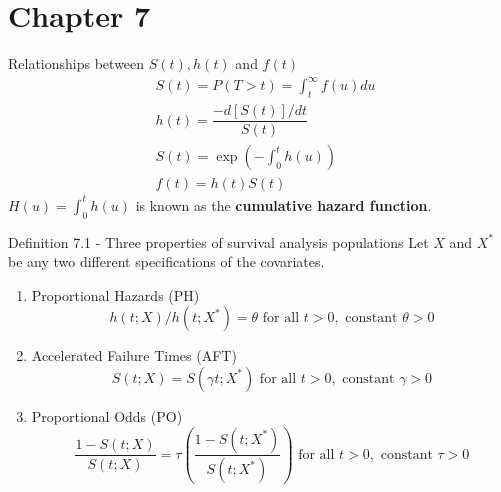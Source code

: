 \documentclass{beamer}
\theoremstyle{definition}
\begin{document}
\section{Chapter 7}
\begin{frame}
\begin{block}{Relationships between $S(t), h(t)$ and $f(t)$}
\begin{align*}
& S(t) = P(T>t) = \int_t^\infty f(u) du  \\
& h(t) = \dfrac{-d[S(t)]/dt}{S(t)} \\
& S(t) = \exp\left(-\int_0^t h(u)\right) \\
& f(t) = h(t) S(t)
\end{align*}
$H(u)=\int_0^t h(u)$ is known as the \textbf{cumulative hazard function}.
\end{block}
\end{frame}
\begin{frame}
\begin{block}{Definition 7.1 - Three properties of survival analysis populations}
Let $X$ and $X^*$ be any two different specifications of the covariates.
\begin{enumerate}
\item Proportional Hazards (PH)
\[ h(t;X)/h(t;X^*) = \theta \text{ for all } t>0, \text{ constant } \theta > 0 \]
\item Accelerated Failure Times (AFT)
\[ S(t;X) =  S(\gamma t;X^*)  \text{ for all } t>0, \text{ constant } \gamma > 0
\]
\item Proportional Odds (PO)
\[ \frac{1- S(t;X)}{S(t;X)} = \tau \left(\frac{1- S(t;X^*)}{S(t;X^*)}\right)  \text{ for all } t>0, \text{ constant } \tau > 0
\]
\end{enumerate}
\end{block}
\end{frame}
\end{document}
